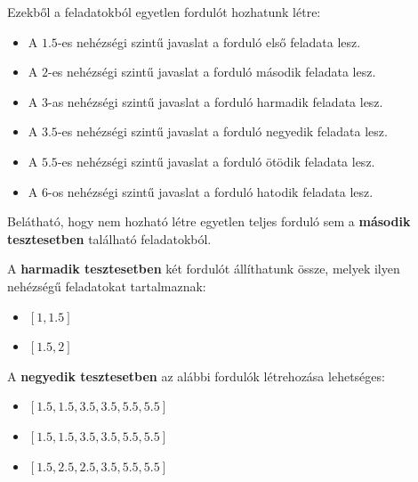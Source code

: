 Ezekből a feladatokból egyetlen fordulót hozhatunk létre:
\begin{itemize}
\item A $1.5$-es nehézségi szintű javaslat a forduló első feladata lesz.

\item A $2$-es nehézségi szintű javaslat a forduló második feladata lesz.

\item A $3$-as nehézségi szintű javaslat a forduló harmadik feladata lesz.

\item A $3.5$-es nehézségi szintű javaslat a forduló negyedik feladata lesz.

\item A $5.5$-es nehézségi szintű javaslat a forduló ötödik feladata lesz.

\item A $6$-os nehézségi szintű javaslat a forduló hatodik feladata lesz.

\end{itemize}

Belátható, hogy nem hozható létre egyetlen teljes forduló sem a \textbf{második tesztesetben} található feladatokból.


A \textbf{harmadik tesztesetben} két fordulót állíthatunk össze, melyek ilyen nehézségű feladatokat tartalmaznak:
\begin{itemize}
\item $[1,1.5]$
\item $[1.5,2]$
\end{itemize}

A \textbf{negyedik tesztesetben} az alábbi fordulók létrehozása lehetséges:
\begin{itemize}
\item $[1.5,1.5,3.5,3.5,5.5,5.5]$
\item $[1.5,1.5,3.5,3.5,5.5,5.5]$
\item $[1.5,2.5,2.5,3.5,5.5,5.5]$
\end{itemize}

